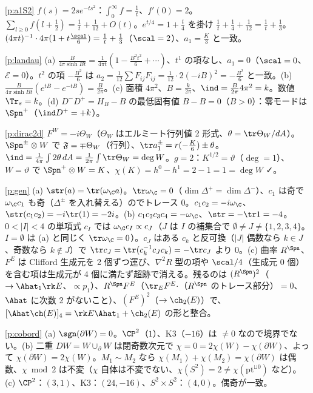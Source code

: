 \begin{sol}{\ref{p:a1S2}}
$f(s)=2se^{-ts^2}$：$\int_0^\infty f=\frac1t$、$f'(0)=2$。$\sum_{l\ge0}f(l+\frac12)=\frac1t+\frac1{12}+O(t)$。$e^{t/4}=1+\frac t4$ を掛け $\frac1t+\frac14+\frac1{12}=\frac1t+\frac13$。$(4\pi t)^{-1}\cdot4\pi(1+t\frac{\scal}6)=\frac1t+\frac13$（$\scal=2$）、$a_1=\frac K3$ と一致。
\end{sol}
\begin{sol}{\ref{p:landau}}
(a) $\frac B{4\pi\sinh Bt}=\frac1{4\pi t}(1-\frac{B^2t^2}6+\cdots)$、$t^1$ の項なし、$a_1=0$（$\scal=0$、$\mathcal E=0$）。$t^2$ の項 $-\frac{B^2}6$ は $a_2=\frac1{12}\sum F_{ij}F_{ij}=\frac1{12}\cdot2(-iB)^2=-\frac{B^2}6$ と一致。(b) $\frac B{4\pi\sinh Bt}(e^{tB}-e^{-tB})=\frac B{2\pi}$。(c) 面積 $4\pi^2$、$B=\frac k{2\pi}$、$\ind=\frac B{2\pi}4\pi^2=k$。数値 $\Tr_s=k$。(d) $D^-D^+=H_B-B$ の最低固有値 $B-B=0$（$B>0$）：零モードは $\Spn^+$（$\ind D^+=+k$）。
\end{sol}
\begin{sol}{\ref{p:dirac2d}}
$F^W=-i\Theta_W$（$\Theta_W$ はエルミート行列値 2 形式、$\theta=\tr\Theta_W/dA$）。$\Spn^\pm\otimes W$ で $\frak F=\mp\Theta_W$（行列）、$\tr a_1^\pm=r(-\frac K6)\pm\theta$。$\ind=\frac1{4\pi}\int2\theta\,dA=\frac1{2\pi}\int\tr\Theta_W=\deg W$。$g=2$：$K^{1/2}=\vartheta$（$\deg=1$）、$W=\vartheta$ で $\Spn^+\otimes W=K$、$\chi(K)=h^0-h^1=2-1=1=\deg W$ ✓。
\end{sol}
\begin{sol}{\ref{p:gen}}
(a) $\str(a)=\tr(\omega_{\C}a)$。$\tr\omega_{\C}=0$（$\dim\Delta^+=\dim\Delta^-$）、$c_1$ は奇で $\omega_{\C}c_1$ も奇（$\Delta^\pm$ を入れ替える）のでトレース $0$。$c_1c_2=-i\omega_{\C}$、$\str(c_1c_2)=-i\tr(1)=-2i$。(b) $c_1c_2c_3c_4=-\omega_{\C}$、$\str=-\tr1=-4$。$0<|I|<4$ の単項式 $c_I$ では $\omega_{\C}c_I\propto c_J$（$J$ は $I$ の補集合で $\emptyset\ne J\ne\{1,2,3,4\}$。$I=\emptyset$ は (a) と同じく $\tr\omega_{\C}=0$）。$c_J$ はある $c_k$ と反可換（$|J|$ 偶数なら $k\in J$、奇数なら $k\notin J$）で $\tr c_J=\tr(c_k^{-1}c_Jc_k)=-\tr c_J$ より $0$。(c) 曲率 $R^{\Spn}$、$F^E$ は Clifford 生成元を 2 個ずつ運び、$\nabla^2R$ 型の項や $\scal/4$（生成元 0 個）を含む項は生成元が 4 個に満たず超跡で消える。残るのは $(R^{\Spn})^2$（$\to\Ahat_1\rk E$、$\propto p_1$）、$R^{\Spn}F^E$（$\tr_E F^E\cdot$（$R^{\Spn}$ のトレース部分）$=0$、$\Ahat$ に次数 2 がないこと）、$(F^E)^2$（$\to\ch_2(E)$）で、$[\Ahat\ch(E)]_4=\rk E\Ahat_1+\ch_2(E)$ の形と整合。
\end{sol}
\begin{sol}{\ref{p:cobord}}
(a) $\sgn(\partial W)=0$。$\CP^2$（$1$）、K3（$-16$）は $\ne0$ なので境界でない。(b) 二重 $DW=W\cup_{\partial}W$ は閉奇数次元で $\chi=0=2\chi(W)-\chi(\partial W)$、よって $\chi(\partial W)=2\chi(W)$。$M_1\sim M_2$ なら $\chi(M_1)+\chi(M_2)=\chi(\partial W)$ は偶数、$\chi\bmod2$ は不変（$\chi$ 自体は不変でない、$\chi(S^2)=2\ne\chi(\mathrm{pt}^{\sqcup0})$ など）。(c) $\CP^2$：$(3,1)$、K3：$(24,-16)$、$S^2\times S^2$：$(4,0)$。偶奇が一致。
\end{sol}
